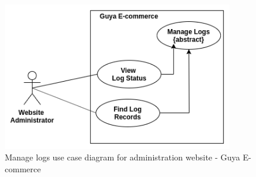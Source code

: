 \begin{figure}[!ht]
\centering
\includegraphics[width=10cm,keepaspectratio]{usecases/manage_logs_usecase_admin}
\caption{Manage logs use case diagram for administration website - Guya E-commerce}
\end{figure}

